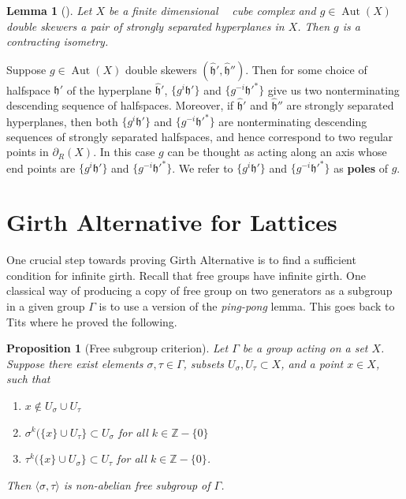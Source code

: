 \documentclass{amsart}
\newtheorem{lemma}[theorem]{Lemma}
\newtheorem{proposition}[theorem]{Proposition}
\theoremstyle{definition}
\newtheorem*{Notation warning}{Warning on notations}
\newtheorem*{Sketch of proof}{Sketch of proof for Theorem C}
\newcommand{\h}{{\mathfrak h}}
\newcommand{\hh}{\hat{\mathfrak h}}
\DeclareMathOperator{\cat}{CAT(0)}
\def\aut{\mathop{\mathrm{Aut}}\nolimits}
\begin{document}
\begin{sloppypar}
\begin{lemma}[\cite{Caprace_2011}]\label{contracting isom and hyperplanes}
    Let $X$ be a finite dimensional $\cat$ cube complex and $g\in \aut(X)$ double skewers a pair  of strongly separated hyperplanes in $X$. Then $g$ is a contracting isometry.
\end{lemma}

Suppose $g\in \aut(X)$ double skewers $(\hh',\hh'')$.
Then for some choice of halfspace $\h'$ of the hyperplane $\hh'$,  $\{g^i\h'\}$ and $\{g^{-i}\h'^*\}$ give us two nonterminating descending sequence of halfspaces.
Moreover, if $\hh'$ and $\hh''$ are strongly separated hyperplanes, then both $\{g^i\h'\}$ and $\{g^{-i}\h'^*\}$ are nonterminating descending sequences of strongly separated halfspaces, and hence correspond to two regular points in $\partial_R(X)$.
In this case $g$ can be thought as acting along an axis whose end points are $\{g^i\h'\}$ and $\{g^{-i}\h'^*\}$.
We refer to $\{g^i\h'\}$ and $\{g^{-i}\h'^*\}$ as {\bf poles} of $g$. 


\section{Girth Alternative for Lattices}\label{section:GAforlattices}

One crucial step towards proving Girth Alternative is to find a  sufficient condition for infinite girth.
Recall that free groups have infinite girth.
One classical way of producing a copy of free group on two generators as a subgroup in a given group $\Gamma$ is to use a version of the  \emph{ping-pong} lemma. 
This goes back to  Tits \cite{Tits1972FreeSI} where he proved the following.
\begin{proposition}[Free subgroup criterion]\label{free subgroup criterion}
    Let $\Gamma$ be a group acting on a set $X$. Suppose there exist elements $\sigma,\tau\in \Gamma$, subsets $U_\sigma,U_\tau\subset X$, and a point $x\in X$, such that 
    \begin{enumerate}
        \item $x\notin U_\sigma\cup U_\tau$
        \item $\sigma^k(\{x\}\cup U_\tau\}\subset U_\sigma$ for all $k\in \mathbb{Z}-\{0\}$
        \item $\tau^k(\{x\}\cup U_\sigma\}\subset U_\tau$ for all $k\in \mathbb{Z}-\{0\}$.    \end{enumerate}
        Then $\langle \sigma,\tau\rangle $ is non-abelian free subgroup of $\Gamma$.
\end{proposition}


\end{sloppypar}
\end{document}
